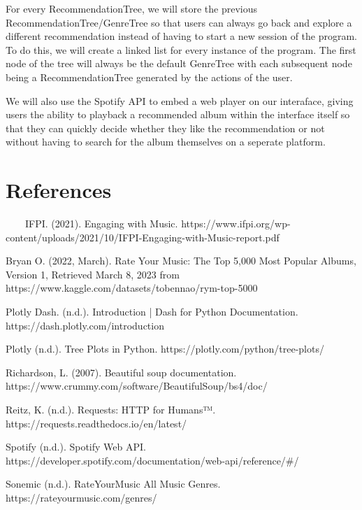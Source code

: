 \documentclass[fontsize=11pt]{article}
\begin{document}
For every RecommendationTree, we will store the previous RecommendationTree/GenreTree so that users can always go back and explore a different recommendation instead of having to start a new session of the program. To do this, we will create a linked list for every instance of the program. The first node of the tree will always be the default GenreTree with each subsequent node being a RecommendationTree generated by the actions of the user. \newline

We will also use the Spotify API to embed a web player on our interaface, giving users the ability to playback a recommended album within the interface itself so that they can quickly decide whether they like the recommendation or not without having to search for the album themselves on a seperate platform.

\section*{References}
~~~~IFPI. (2021). Engaging with Music. https://www.ifpi.org/wp-content/uploads/2021/10/IFPI-Engaging-with-Music-report.pdf \newline

Bryan O. (2022, March). Rate Your Music: The Top 5,000 Most Popular Albums, Version 1, Retrieved March 8, 2023 from https://www.kaggle.com/datasets/tobennao/rym-top-5000 \newline

Plotly Dash. (n.d.). Introduction | Dash for Python Documentation. https://dash.plotly.com/introduction \newline

Plotly (n.d.). Tree Plots in Python. https://plotly.com/python/tree-plots/ \newline
‌

‌Richardson, L. (2007). Beautiful soup documentation. https://www.crummy.com/software/BeautifulSoup/bs4/doc/ \newline

Reitz, K. (n.d.). Requests: HTTP for Humans™. https://requests.readthedocs.io/en/latest/ \newline

Spotify (n.d.). Spotify Web API. https://developer.spotify.com/documentation/web-api/reference/\#/ \newline

Sonemic (n.d.). RateYourMusic All Music Genres. https://rateyourmusic.com/genres/

\end{document}
